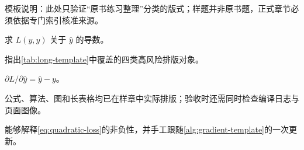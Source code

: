 \documentclass[UTF8,a4paper,11pt,openany]{ctexbook}
\begin{document}
\begin{chapterexercisebox}
\SLSourceBookExercises
\textnormal{模板说明：此处只验证“原书练习整理”分类的版式；样题并非原书题，正式章节必须依据专门索引核准来源。}
\begin{exercise}\label{exr:template-gradient}
求 $L(y,\hat y)$ 关于 $\hat y$ 的导数。
\end{exercise}
\SLLectureSupplementExercises
\begin{exercise}\label{exr:template-risk}
指出\cref{tab:long-template}中覆盖的四类高风险排版对象。
\end{exercise}
\end{chapterexercisebox}
\begin{chapteranswerbox}
\begin{solution}
$\partial L/\partial\hat y=\hat y-y$。
\end{solution}
\begin{solution}
公式、算法、图和长表格均已在样章中实际排版；验收时还需同时检查编译日志与页面图像。
\end{solution}
\end{chapteranswerbox}
\begin{notapplicablebox}[title=契约示例：确实不适用]
\end{notapplicablebox}
\begin{selfcheckbox}
能够解释\cref{eq:quadratic-loss}的非负性，并手工跟随\cref{alg:gradient-template}的一次更新。
\end{selfcheckbox}
\backmatter
\printbookindexes
\end{document}
